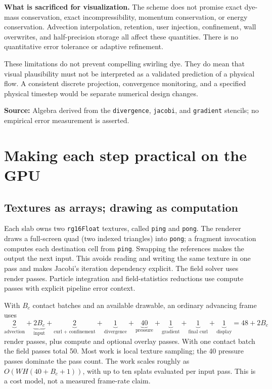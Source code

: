 \documentclass[11pt,a4paper]{article}
\newcommand{\src}[1]{\par{\footnotesize\raggedright\color{teal}\textbf{Source:} #1\par}}
\newcommand{\code}[1]{\texttt{#1}}
\newcommand{\note}[1]{\par\smallskip\noindent\colorbox{pale}{\parbox{\dimexpr\linewidth-2\fboxsep\relax}{#1}}\par\smallskip}
\newcommand{\page}[1]{\clearpage\section{#1}}
\begin{document}
\note{\textbf{What is sacrificed for visualization.} The scheme does not promise
exact dye-mass conservation, exact incompressibility, momentum conservation, or
energy conservation. Advection interpolation, retention, user injection,
confinement, wall overwrites, and half-precision storage all affect these
quantities. There is no quantitative error tolerance or adaptive refinement.}

These limitations do not prevent compelling swirling dye. They do mean that
visual plausibility must not be interpreted as a validated prediction of a
physical flow. A consistent discrete projection, convergence monitoring, and a
specified physical timestep would be separate numerical design changes.
\src{Algebra derived from the \code{divergence}, \code{jacobi}, and
\code{gradient} stencils; no empirical error measurement is asserted.}

\page{Making each step practical on the GPU}
\subsection*{Textures as arrays; drawing as computation}
Each slab owns two \code{rg16Float} textures, called \code{ping} and
\code{pong}. The renderer draws a full-screen quad (two indexed triangles) into
\code{pong}; a fragment invocation computes each destination cell from
\code{ping}. Swapping the references makes the output the next input.
This avoids reading and writing the same texture in one pass and makes Jacobi's
iteration dependency explicit. The field solver uses render passes. Particle integration and field-statistics reductions use compute passes with explicit pipeline error context.

With $B_c$ contact batches and an available drawable, an ordinary advancing
frame uses
\begin{equation}
 \underbrace{2}_{\text{advection}}
 +\underbrace{2B_c}_{\text{input}}
 +\underbrace{2}_{\text{curl + confinement}}
 +\underbrace{1}_{\text{divergence}}
 +\underbrace{40}_{\text{pressure}}
 +\underbrace{1}_{\text{gradient}}
 +\underbrace{1}_{\text{final curl}}+\underbrace{1}_{\text{display}}=48+2B_c
\end{equation}
render passes, plus compute and optional overlay passes. With one contact batch the field passes total 50. Most work is local texture
sampling; the 40 pressure passes dominate the pass count. The work scales
roughly as $O(WH(40+B_c+1))$, with up to ten splats evaluated per input pass.
This is a cost model, not a measured frame-rate claim.
\end{document}
